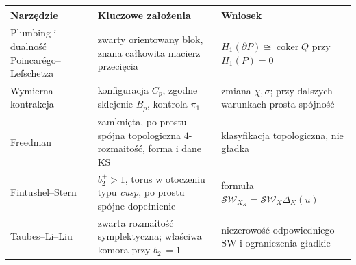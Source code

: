 \begin{center}
\begingroup
\footnotesize
\renewcommand{\arraystretch}{1.4}
\begin{tabular}{@{}p{.255\linewidth}p{.365\linewidth}p{.30\linewidth}@{}}
\hline
\textbf{Narzędzie} & \textbf{Kluczowe założenia} & \textbf{Wniosek}\\
\hline
{\raggedright Plumbing i dualność Poincar\'ego--Lefschetza\par}
 & {\raggedright zwarty orientowany blok, znana całkowita macierz przecięcia\par}
 & {\raggedright $H_1(\partial P)\cong\operatorname{coker}Q$ przy $H_1(P)=0$\par}\\
{\raggedright Wymierna kontrakcja\par}
 & {\raggedright konfiguracja $C_p$, zgodne sklejenie $B_p$, kontrola $\pi_1$\par}
 & {\raggedright zmiana $\chi,\sigma$; przy dalszych warunkach prosta spójność\par}\\
{\raggedright Freedman\par}
 & {\raggedright zamknięta, po prostu spójna topologiczna $4$-rozmaitość, forma i dane KS\par}
 & {\raggedright klasyfikacja topologiczna, nie gładka\par}\\
{\raggedright Fintushel--Stern\par}
 & {\raggedright $b_2^+>1$, torus w otoczeniu typu \emph{cusp}, po prostu spójne dopełnienie\par}
 & {\raggedright formuła $\mathcal{SW}_{X_K}=\mathcal{SW}_X\Delta_K(u)$\par}\\
{\raggedright Taubes--Li--Liu\par}
 & {\raggedright zwarta rozmaitość symplektyczna; właściwa komora przy $b_2^+=1$\par}
 & {\raggedright niezerowość odpowiedniego SW i ograniczenia gładkie\par}\\
\hline
\end{tabular}
\endgroup
\end{center}

